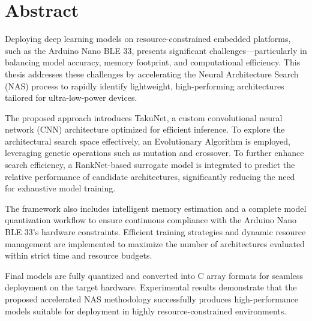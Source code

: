 \section*{Abstract}






Deploying deep learning models on resource-constrained embedded platforms, such as the Arduino Nano BLE 33, presents significant challenges—particularly in balancing model accuracy, memory footprint, and computational efficiency. This thesis addresses these challenges by accelerating the Neural Architecture Search (NAS) process to rapidly identify lightweight, high-performing architectures tailored for ultra-low-power devices.

The proposed approach introduces TakuNet, a custom convolutional neural network (CNN) architecture optimized for efficient inference. To explore the architectural search space effectively, an Evolutionary Algorithm is employed, leveraging genetic operations such as mutation and crossover. To further enhance search efficiency, a RankNet-based surrogate model is integrated to predict the relative performance of candidate architectures, significantly reducing the need for exhaustive model training.

The framework also includes intelligent memory estimation and a complete model quantization workflow to ensure continuous compliance with the Arduino Nano BLE 33's hardware constraints. Efficient training strategies and dynamic resource management are implemented to maximize the number of architectures evaluated within strict time and resource budgets.

Final models are fully quantized and converted into C array formats for seamless deployment on the target hardware. Experimental results demonstrate that the proposed accelerated NAS methodology successfully produces high-performance models suitable for deployment in highly resource-constrained environments.







